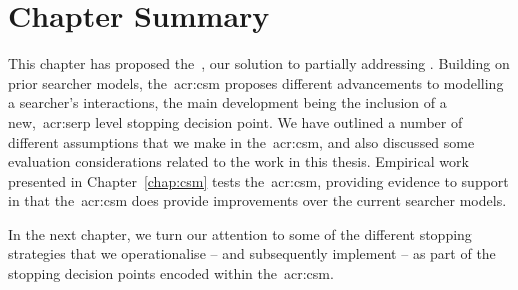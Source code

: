 \section{Chapter Summary}
This chapter has proposed the~, our solution to partially addressing . Building on prior searcher models, the~\gls{acr:csm} proposes different advancements to modelling a searcher's interactions, the main development being the inclusion of a new,~\gls{acr:serp} level stopping decision point. We have outlined a number of different assumptions that we make in the~\gls{acr:csm}, and also discussed some evaluation considerations related to the work in this thesis. Empirical work presented in Chapter~\ref{chap:csm} tests the~\gls{acr:csm}, providing evidence to support  in that the~\gls{acr:csm} does provide improvements over the current searcher models.

In the next chapter, we turn our attention to some of the different stopping strategies that we operationalise -- and subsequently implement -- as part of the stopping decision points encoded within the~\gls{acr:csm}.

\newpage
\thispagestyle{empty}
\mbox{}